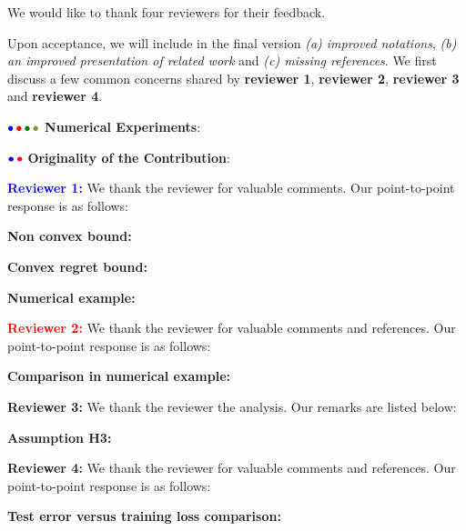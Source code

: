 \documentclass{article}
\begin{document}
We would like to thank four reviewers for their feedback. 

Upon acceptance, we will include in the final version \emph{{\sf (a)} improved notations}, \emph{{\sf (b)} an improved presentation of related work} and \emph{{\sf (c)} missing references}. 
We first discuss a few common concerns shared by \textbf{\color{blue}reviewer 1}, \textbf{\color{red} reviewer 2}, \textbf{\color{green!50!black}reviewer 3} and \textbf{\color{yellow!50!black}reviewer 4}.

${\color{blue}\bullet}\!~{\color{red}\bullet}\!~{\color{green!50!black}\bullet}\!~{\color{yellow!50!black}\bullet}$ \textbf{Numerical Experiments}: 


${\color{blue}\bullet}\!~{\color{red}\bullet}$ \textbf{Originality of the Contribution}: 



\textbf{\textcolor{blue}{Reviewer 1:}} We thank the reviewer for valuable comments. Our point-to-point response is as follows:

\textbf{Non convex bound:}


\textbf{Convex regret bound:}

\textbf{Numerical example:}


\textbf{\textcolor{red}{Reviewer 2:}} We thank the reviewer for valuable comments and references. Our point-to-point response is as follows:

\textbf{Comparison in numerical example:}


\textbf{\textcolor{green!50!black}{Reviewer 3:}} We thank the reviewer the analysis. Our remarks are listed below:

\textbf{Assumption H3:}


\textbf{\textcolor{yellow!50!black}{Reviewer 4:}} We thank the reviewer for valuable comments and references. Our point-to-point response is as follows:

\textbf{Test error versus training loss comparison:}
\end{document}
